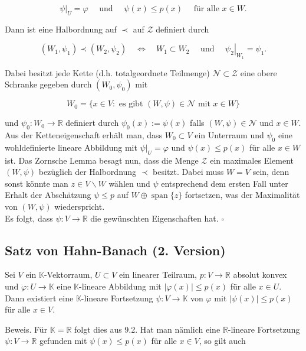 \documentclass[10pt, letterpaper]{article}
\begin{document}
$$
\left.\psi\right|_{U}=\varphi \quad \text { und } \quad \psi(x) \leq p(x) \quad \text { für alle } x \in W .
$$

Dann ist eine Halbordnung auf $\prec$ auf $\mathcal{Z}$ definiert durch

$$
\left(W_{1}, \psi_{1}\right) \prec\left(W_{2}, \psi_{2}\right) \quad \Longleftrightarrow \quad W_{1} \subset W_{2} \quad \text { und }\left.\quad \psi_{2}\right|_{W_{1}}=\psi_{1} .
$$

Dabei besitzt jede Kette (d.h. totalgeordnete Teilmenge) $\mathcal{N} \subset \mathcal{Z}$ eine obere Schranke gegeben durch $\left(W_{0}, \psi_{0}\right)$ mit

$$
W_{0}=\{x \in V: \text { es gibt }(W, \psi) \in \mathcal{N} \text { mit } x \in W\}
$$

und $\psi_{0}: W_{0} \rightarrow \mathbb{R}$ definiert durch $\psi_{0}(x):=\psi(x)$ falls $(W, \psi) \in \mathcal{N}$ und $x \in W$. Aus der Ketteneigenschaft erhält man, dass $W_{0} \subset V$ ein Unterraum und $\psi_{0}$ eine wohldefinierte lineare Abbildung mit $\left.\psi\right|_{U}=\varphi$ und $\psi(x) \leq p(x)$ für alle $x \in W$ ist. Das Zornsche Lemma besagt nun, dass die Menge $\mathcal{Z}$ ein maximales Element $(W, \psi)$ bezüglich der Halbordnung $\prec$ besitzt. Dabei muss $W=V$ sein, denn sonst könnte man $z \in V \backslash W$ wählen und $\psi$ entsprechend dem ersten Fall unter Erhalt der Abschätzung $\psi \leq p$ auf $W \oplus \operatorname{span}\{z\}$ fortsetzen, was der Maximalität von $(W, \psi)$ wiederspricht.\\
Es folgt, dass $\psi: V \rightarrow \mathbb{R}$ die gewünschten Eigenschaften hat. \(\square\)

\subsection*{Satz von Hahn-Banach (2. Version)}
Sei $V$ ein $\mathbb{K}$-Vektorraum, $U \subset V$ ein linearer Teilraum, $p: V \rightarrow \mathbb{R}$ absolut konvex und $\varphi: U \rightarrow \mathbb{K}$ eine $\mathbb{K}$-lineare Abbildung mit $|\varphi(x)| \leq p(x)$ für alle $x \in U$. Dann existiert eine $\mathbb{K}$-lineare Fortsetzung $\psi: V \rightarrow \mathbb{K}$ von $\varphi$ mit $|\psi(x)| \leq p(x)$ für alle $x \in V$.

Beweis. Für $\mathbb{K}=\mathbb{R}$ folgt dies aus 9.2. Hat man nämlich eine $\mathbb{R}$-lineare Fortsetzung $\psi: V \rightarrow \mathbb{R}$ gefunden mit $\psi(x) \leq p(x)$ für alle $x \in V$, so gilt auch
\end{document}
